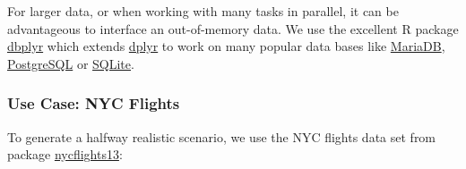 \documentclass[]{article}
\begin{document}
For larger data, or when working with many tasks in parallel, it can be advantageous to interface an out-of-memory data.
We use the excellent R package \href{https://cran.r-project.org/package=dbplyr}{dbplyr} which extends \href{https://cran.r-project.org/package=dplyr}{dplyr} to work on many popular data bases like \href{https://mariadb.org/}{MariaDB}, \href{https://www.postgresql.org/}{PostgreSQL} or \href{https://www.sqlite.org}{SQLite}.

\hypertarget{use-case-nyc-flights}{%
\subsubsection{Use Case: NYC Flights}\label{use-case-nyc-flights}}

To generate a halfway realistic scenario, we use the NYC flights data set from package \href{https://cran.r-project.org/package=nycflights13}{nycflights13}:
\end{document}
